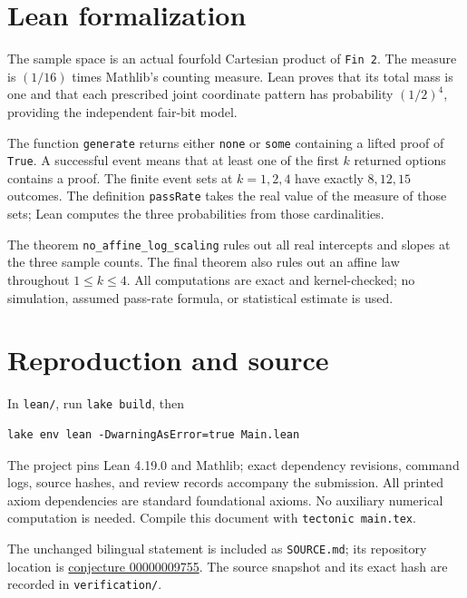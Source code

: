 \documentclass[11pt]{article}
\begin{document}
\section*{Lean formalization}
The sample space is an actual fourfold Cartesian product of \texttt{Fin 2}. The measure is $(1/16)$ times Mathlib's counting measure. Lean proves that its total mass is one and that each prescribed joint coordinate pattern has probability $(1/2)^4$, providing the independent fair-bit model.

The function \texttt{generate} returns either \texttt{none} or \texttt{some} containing a lifted proof of \texttt{True}. A successful event means that at least one of the first $k$ returned options contains a proof. The finite event sets at $k=1,2,4$ have exactly $8,12,15$ outcomes. The definition \texttt{passRate} takes the real value of the measure of those sets; Lean computes the three probabilities from those cardinalities.

The theorem \texttt{no\_affine\_log\_scaling} rules out all real intercepts and slopes at the three sample counts. The final theorem also rules out an affine law throughout $1\leq k\leq4$. All computations are exact and kernel-checked; no simulation, assumed pass-rate formula, or statistical estimate is used.

\section*{Reproduction and source}
In \texttt{lean/}, run \texttt{lake build}, then
\begin{verbatim}
lake env lean -DwarningAsError=true Main.lean
\end{verbatim}
The project pins Lean 4.19.0 and Mathlib; exact dependency revisions, command logs, source hashes, and review records accompany the submission. All printed axiom dependencies are standard foundational axioms. No auxiliary numerical computation is needed. Compile this document with \texttt{tectonic main.tex}.

The unchanged bilingual statement is included as \texttt{SOURCE.md}; its repository location is \href{https://github.com/The-Last-Math-Competition/The-Last-Math-Competition/blob/main/conjectures/00000009755.md}{conjecture 00000009755}. The source snapshot and its exact hash are recorded in \texttt{verification/}.
\end{document}
